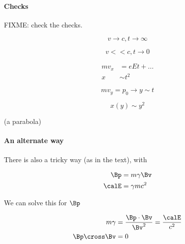 {\paragraph{Checks}

FIXME: check the checks.

\begin{equation}\label{eqn:relativisticElectrodynamicsT3:420}
v \rightarrow c, t \rightarrow \infty
\end{equation}

\begin{equation}\label{eqn:relativisticElectrodynamicsT3:440}
v << c, t \rightarrow 0
\end{equation}

\begin{equation}\label{eqn:relativisticElectrodynamicsT3:990}
\begin{aligned}
m v_x &= e E t + ... \\
x &\sim t^2 
\end{aligned}
\end{equation}

\begin{equation}\label{eqn:relativisticElectrodynamicsT3:460}
m v_y = p_0 \rightarrow y \sim t
\end{equation}

\begin{equation}\label{eqn:relativisticElectrodynamicsT3:480}
x(y) \sim y^2
\end{equation}

(a parabola)

\paragraph{An alternate way}

There is also a tricky way (as in the text), with 

\begin{equation}\label{eqn:relativisticElectrodynamicsT3:160}
\begin{aligned}
\Bp &= m \gamma \Bv  \\
\calE &= \gamma m c^2 
\end{aligned}
\end{equation}

We can solve this for \(\Bp\)

\begin{equation}\label{eqn:relativisticElectrodynamicsT3:1010}
\begin{aligned}
m \gamma &= \frac{\Bp \cdot \Bv}{\Bv^2} = \frac{\calE}{c^2} \\
\Bp \cross \Bv &= 0
\end{aligned}
\end{equation}

}
